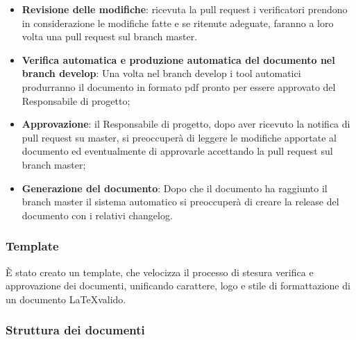 \begin{itemize}
  \item \textbf{Revisione delle modifiche}: ricevuta la pull request i verificatori
  prendono in considerazione le modifiche fatte e se ritenute adeguate, faranno a
  loro volta una pull request sul branch master.

  \item \textbf{Verifica automatica e produzione automatica del documento nel
  branch develop}: Una volta nel branch develop i tool automatici produrranno il
  documento in formato pdf pronto per essere approvato del Responsabile di progetto;

  \item \textbf{Approvazione}: il Responsabile di progetto, dopo aver ricevuto la notifica
  di pull request su master, si preoccuper\`a di leggere le modifiche apportate al documento
  ed eventualmente di approvarle accettando la pull request sul branch master;

  \item \textbf{Generazione del documento}: Dopo che il documento ha raggiunto il
  branch master il sistema automatico si preoccuper\`a di creare la release del
  documento con i relativi changelog.
\end{itemize}

\subsubsection{Template}
\`E stato creato un template, che velocizza il processo di stesura verifica e
approvazione dei documenti, unificando carattere, logo e stile di formattazione
di un documento \LaTeX \space valido.

\subsubsection{Struttura dei documenti}
